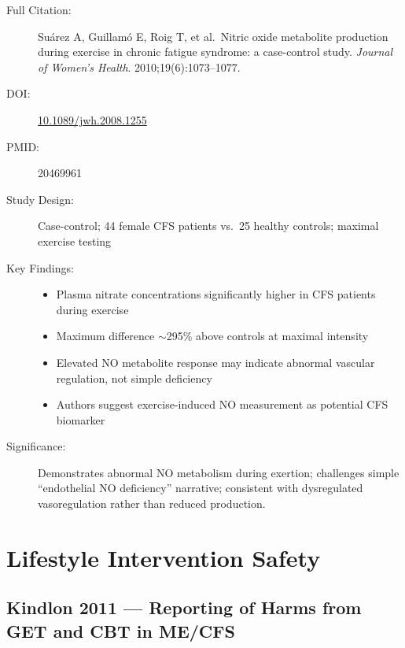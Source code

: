 \begin{description}
    \item[Full Citation:] Suárez A, Guillamó E, Roig T, et al.\ Nitric oxide metabolite production during exercise in chronic fatigue syndrome: a case-control study. \textit{Journal of Women's Health}. 2010;19(6):1073--1077.
    \item[DOI:] \href{https://doi.org/10.1089/jwh.2008.1255}{10.1089/jwh.2008.1255}
    \item[PMID:] 20469961
    \item[Study Design:] Case-control; 44 female CFS patients vs.\ 25 healthy controls; maximal exercise testing
    \item[Key Findings:]
    \begin{itemize}
        \item Plasma nitrate concentrations significantly higher in CFS patients during exercise
        \item Maximum difference $\sim$295\% above controls at maximal intensity
        \item Elevated NO metabolite response may indicate abnormal vascular regulation, not simple deficiency
        \item Authors suggest exercise-induced NO measurement as potential CFS biomarker
    \end{itemize}
    \item[Significance:] Demonstrates abnormal NO metabolism during exertion; challenges simple ``endothelial NO deficiency'' narrative; consistent with dysregulated vasoregulation rather than reduced production.
\end{description}

\section{Lifestyle Intervention Safety}
\label{sec:bib-lifestyle-safety}

\subsection{Kindlon 2011 --- Reporting of Harms from GET and CBT in ME/CFS}

